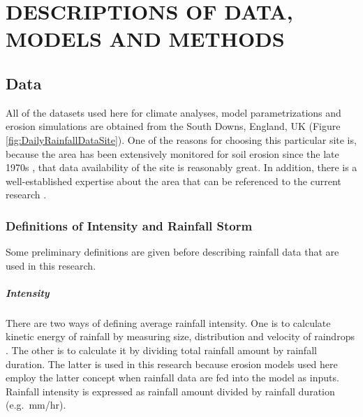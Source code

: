 \chapter{DESCRIPTIONS OF DATA, MODELS AND METHODS}
\label{sec:SIMULATIONDATAMODELSANDMETHODS}

\section{Data}
\label{sec:Data}

All of the datasets used here for climate analyses, model parametrizations and
erosion simulations are obtained from the South Downs, England, UK (Figure
\ref{fig:DailyRainfallDataSite}).
One of the reasons for choosing this particular site is, because the area has
been extensively monitored for soil erosion since the late 1970s
\citep{boardman1995-177,boardman2003-176}, that data availability of the
site is reasonably great. In addition, there is a well-established expertise
about the area that can be referenced to the current research
\citep{boardman1995-177,favis-mortlock1995-365,favis-mortlock1997-79,
favis-mortlock1998-141,boardman2001-346,boardman2003-176}.


\subsection{Definitions of Intensity and Rainfall Storm}

Some preliminary definitions are given before describing rainfall data that are
used in this research.

\paragraph{Intensity} There are two ways of defining average
rainfall intensity. One is to calculate kinetic energy of rainfall by measuring
size, distribution and velocity of raindrops \citep{vandijk2002-1}. The other is
to calculate it by dividing total rainfall amount by rainfall duration. The
latter is used in this research because erosion models used here employ the
latter concept when rainfall data are fed into the model as inputs. Rainfall
intensity is expressed as rainfall amount divided by rainfall duration (e.g.\
mm/hr).

